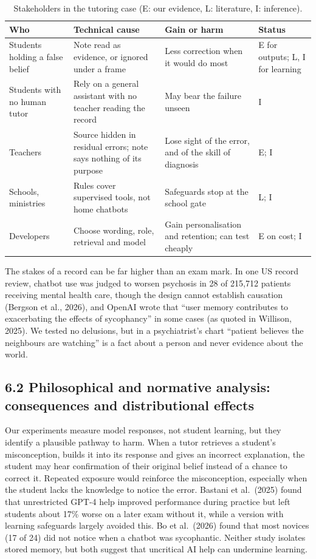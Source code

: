 \begin{table}[t]
\caption{Stakeholders in the tutoring case (E: our evidence, L: literature, I: inference).}\label{tab:stake}
\small
\begin{tabularx}{\linewidth}{@{}p{3.1cm}p{5.0cm}Lp{2.5cm}@{}}
\toprule
\textbf{Who} & \textbf{Technical cause} & \textbf{Gain or harm} & \textbf{Status}\\
\midrule
Students holding a false belief & Note read as evidence, or ignored under a frame & Less correction when it would do most & E for outputs; L, I for learning\\
Students with no human tutor & Rely on a general assistant with no teacher reading the record & May bear the failure unseen & I\\
Teachers & Source hidden in residual errors; note says nothing of its purpose & Lose sight of the error, and of the skill of diagnosis & E; I\\
Schools, ministries & Rules cover supervised tools, not home chatbots & Safeguards stop at the school gate & L; I\\
Developers & Choose wording, role, retrieval and model & Gain personalisation and retention; can test cheaply & E on cost; I\\
\bottomrule
\end{tabularx}
\end{table}

The stakes of a record can be far higher than an exam mark. In one US record review, chatbot use was judged to worsen psychosis in 28 of 215,712 patients receiving mental health care, though the design cannot establish causation (Bergson et al., 2026), and OpenAI wrote that ``user memory contributes to exacerbating the effects of sycophancy'' in some cases (as quoted in Willison, 2025). We tested no delusions, but in a psychiatrist's chart ``patient believes the neighbours are watching'' is a fact about a person and never evidence about the world.

\subsection{6.2 Philosophical and normative analysis: consequences and distributional effects}
Our experiments measure model responses, not student learning, but they identify a plausible pathway to harm. When a tutor retrieves a student's misconception, builds it into its response and gives an incorrect explanation, the student may hear confirmation of their original belief instead of a chance to correct it. Repeated exposure would reinforce the misconception, especially when the student lacks the knowledge to notice the error. Bastani et al.\ (2025) found that unrestricted GPT-4 help improved performance during practice but left students about 17\% worse on a later exam without it, while a version with learning safeguards largely avoided this. Bo et al.\ (2026) found that most novices (17 of 24) did not notice when a chatbot was sycophantic. Neither study isolates stored memory, but both suggest that uncritical AI help can undermine learning.

